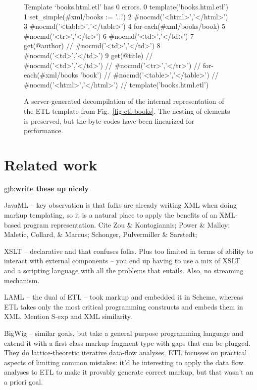 \documentclass{www2003-submission}
\newcommand{\figref}[1]{Fig.~\ref{fig-#1}}
\newcommand{\gjb}[1]{{\sc gjb:}\textbf{#1}}
\newenvironment{smallverbatim}%
{\renewcommand{\baselinestretch}{1}\small\verbatim}%
{\renewcommand{\baselinestretch}{2}\endverbatim}
\begin{document}
\begin{figure}[htbp]
\begin{smallverbatim}
Template `books.html.etl' has 0 errors.
0 template('books.html.etl') {
1  set_simple(#xml/books := '...')
2  #nocmd('<html>','</html>') {
3   #nocmd('<table>','</table>') {
4    for-each(#xml/books/book) {
5     #nocmd('<tr>','</tr>') {
6      #nocmd('<td>','</td>') {
7       get(@author)
       } // #nocmd('<td>','</td>')
8      #nocmd('<td>','</td>') {
9       get(@title)
       } // #nocmd('<td>','</td>')
      } // #nocmd('<tr>','</tr>')
     } // for-each(#xml/books 'book')
    } // #nocmd('<table>','</table>')
   } // #nocmd('<html>','</html>')
  } // template('books.html.etl')
\end{smallverbatim}
\caption{A server-generated decompilation of the internal representation
of the ETL template from \figref{etl-books}.  The nesting of elements
is preserved, but the byte-codes have been linearized for performance.
\label{fig-etl-decompile}}
\end{figure}


\section{Related work}
\label{sec-related-work}

\gjb{write these up nicely}

JavaML -- key observation is that folks are already writing XML when
doing markup templating, so it is a natural place to apply the
benefits of an XML-based program representation.  Cite Zou \&
Kontogiannis; Power \& Malloy; Maletic, Collard, \& Marcus; Schonger,
Pulvermiller \& Sarstedt; 

XSLT -- declarative and that confuses folks.  Plus too limited in
terms of ability to interact with external components -- you end up
having to use a mix of XSLT and a scripting language with all the
problems that entails.  Also, no streaming mechanism.

LAML -- the dual of ETL -- took markup and embedded it in Scheme,
whereas ETL takes only the most critical programming constructs and
embeds them in XML.  Mention S-exp and XML similarity.

BigWig -- similar goals, but take a general purpose programming
language and extend it with a first class markup fragment type with
gaps that can be plugged.  They do lattice-theoretic iterative
data-flow analyses, ETL focusses on practical aspects of limiting
common mistakes:  it'd be interesting to apply the data flow analyses
to ETL to make it provably generate correct markup, but that wasn't an
a priori goal.
\end{document}
